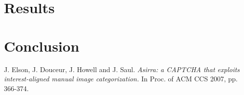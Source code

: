 \documentclass[12pt]{article}
\begin{document}
\section{Results}

\section{Conclusion}

\begin{thebibliography}{99}
 J. Elson, J. Douceur, J. Howell and J. Saul. \textit{Asirra: a CAPTCHA that exploits interest-aligned manual image categorization.} In Proc. of ACM CCS 2007, pp. 366-374.
\end{thebibliography}
\end{document}

